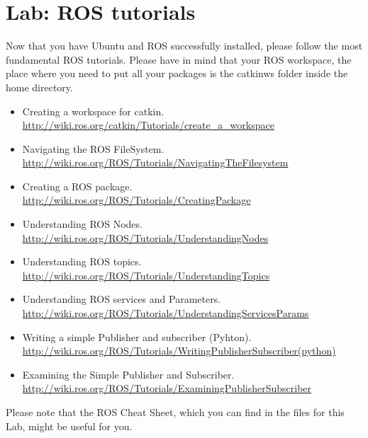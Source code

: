 \documentclass[a4paper,10pt]{article}
\begin{document}
\section{Lab: ROS tutorials}
Now that you have Ubuntu and ROS successfully installed, please follow the most fundamental ROS tutorials. Please have in mind that your ROS workspace, the place where you need to put all your packages is the catkin{\textunderscore}ws folder inside the home directory.

\begin{itemize}
    \item Creating a workspace for catkin.\\
    \url{http://wiki.ros.org/catkin/Tutorials/create_a_workspace}
    
    \item Navigating the ROS FileSystem.\\
    \url{http://wiki.ros.org/ROS/Tutorials/NavigatingTheFilesystem}
    
    \item Creating a ROS package.\\
    \url{http://wiki.ros.org/ROS/Tutorials/CreatingPackage}
    
    \item Understanding ROS Nodes.\\
    \url{http://wiki.ros.org/ROS/Tutorials/UnderstandingNodes}
    
    \item Understanding ROS topics.\\
    \url{http://wiki.ros.org/ROS/Tutorials/UnderstandingTopics}
    
    \item Understanding ROS services and Parameters.\\
    \url{http://wiki.ros.org/ROS/Tutorials/UnderstandingServicesParams}
    
    \item Writing a simple Publisher and subscriber (Pyhton).\\
    \url{http://wiki.ros.org/ROS/Tutorials/WritingPublisherSubscriber(python)}
    
    \item Examining the Simple Publisher and Subscriber.\\
    \url{http://wiki.ros.org/ROS/Tutorials/ExaminingPublisherSubscriber}
\end{itemize}
\noindent
Please note that the ROS Cheat Sheet, which you can find in the files for this Lab, might be useful for you.
\end{document}
